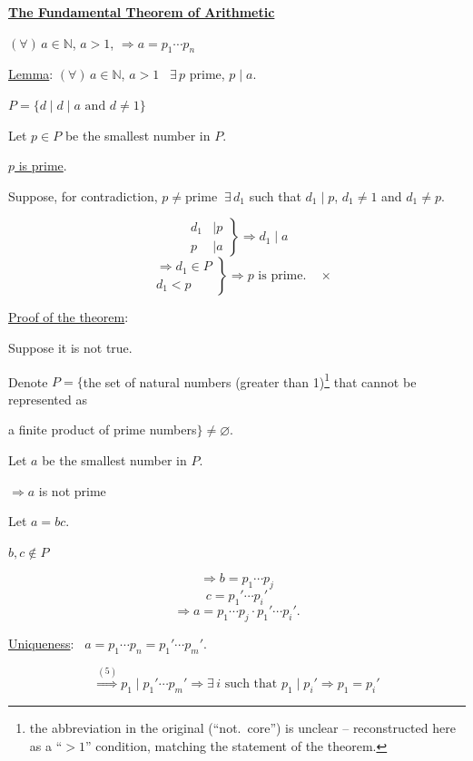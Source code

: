 \documentclass[12pt]{article}
\begin{document}
\noindent\underline{\textbf{The Fundamental Theorem of Arithmetic}}

\bigskip
\noindent $(\forall)\,a\in\mathbb{N}$, $a>1$, $\Rightarrow a=p_1\cdots p_n$


\bigskip
\noindent\underline{Lemma}: $(\forall)\,a\in\mathbb{N}$, $a>1$ \ $\exists\,p$ prime, $p\mid a$.

\bigskip
\noindent $P=\{d \mid d\mid a \text{ and } d\neq 1\}$

\bigskip
\noindent Let $p\in P$ be the smallest number in $P$.

\noindent\underline{$p$ is prime}.

\bigskip
\noindent Suppose, for contradiction, $p\neq$prime $\ \exists\,d_1$ such that $d_1\mid p$, $d_1\neq 1$ and $d_1\neq p$.

\[
\left.\begin{aligned} d_1&\mid p\\ p&\mid a\end{aligned}\right\} \Rightarrow d_1\mid a
\]
\[
\left.\begin{aligned} &\Rightarrow d_1\in P\\ &d_1<p\end{aligned}\right\} \Rightarrow p\text{ is prime.} \quad \times
\]

\bigskip
\noindent\underline{Proof of the theorem}:

\noindent Suppose it is not true.

\noindent Denote $P=\big\{$the set of natural numbers (greater than 1)\footnote{the abbreviation in the original (``not.\ core'') is unclear -- reconstructed here as a ``$>1$'' condition, matching the statement of the theorem.} that cannot be represented as

\noindent a finite product of prime numbers$\big\} \neq \varnothing$.

\bigskip
\noindent Let $a$ be the smallest number in $P$.

\noindent $\Rightarrow a$ is not prime

\bigskip
\noindent Let $a=bc$.

\noindent $b,c\notin P$

\[
\Rightarrow b=p_1\cdots p_j
\]
\[
c=p_1'\cdots p_i'
\]
\[
\Rightarrow a = p_1\cdots p_j\cdot p_1'\cdots p_i'.
\]

\bigskip
\noindent\underline{Uniqueness}: \ $a = p_1\cdots p_n = p_1'\cdots p_m'$.

\[
\overset{(5)}{\Longrightarrow} p_1\mid p_1'\cdots p_m' \Rightarrow \exists\, i \text{ such that } p_1\mid p_i' \Rightarrow p_1=p_i'
\]
\end{document}
